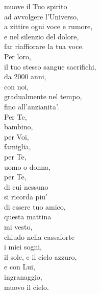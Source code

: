 \begin{haiku}
muove il Tuo spirito\\
ad avvolgere l'Universo,\\
a zittire ogni voce e rumore,\\
e nel silenzio del dolore,\\
far riaffiorare la tua voce.\\
Per loro,\\
il tuo stesso sangue sacrifichi, \\
da 2000 anni,\\
con noi,\\
gradualmente nel tempo,\\
fino all'anzianita'.\\
Per Te,\\
bambino,\\
per Voi,\\
famiglia,\\
per Te,\\
uomo o donna,\\
per Te,\\
di cui nessuno\\
si ricorda piu'\\
di essere tuo amico,\\
questa mattina\\
mi vesto,\\
chiudo nella cassaforte\\
i miei sogni,\\
il sole, e il cielo azzuro,\\
e con Lui,\\
ingranaggio,\\
muovo il cielo.\\
\end{haiku}

